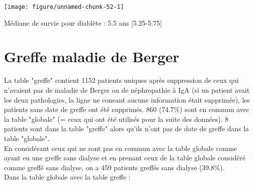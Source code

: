 \documentclass[11pt,a4paper]{article}\usepackage[]{graphicx}\usepackage[]{color}
\makeatletter
\def\maxwidth{ %
  \ifdim\Gin@nat@width>\linewidth
    \linewidth
  \else
    \Gin@nat@width
  \fi
}
\newenvironment{knitrout}{}{} %
\makeatother
\begin{document}
\begin{knitrout}
\color{fgcolor}
\texttt{[image: figure/unnamed-chunk-52-1]} 

\end{knitrout}


Médiane de survie pour diablète : 5.5 ans [5.25-5.75]

  
\section{Greffe maladie de Berger}




La table "greffe" contient 1152 patients uniques après suppression de ceux qui n'avaient pas de maladie de Berger ou de néphropathie à IgA (si un patient avait les deux pathologies, la ligne ne coneant aucune information était supprimée), les patients sans date de greffe ont été supprimés. 860 (74.7\%) sont en commun avec la table "globale" (= ceux qui ont été utilisés pour la suite des données). 8 patients sont dans la table "greffe" alors qu'ils n'ont pas de date de greffe dans la table "globale".
~\\

En considérant ceux qui ne sont pas en commun avec la table globale comme ayant eu une greffe sans dialyse et en prenant ceux de la table globale considéré comme greffé sans dialyse, on a 459 patients greffés sans dialyse (39.8\%).
~\\

Dans la table globale avec la table greffe :
\end{document}
